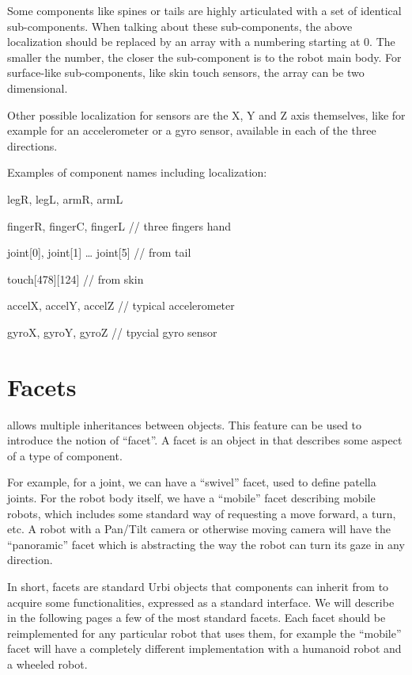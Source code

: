 Some components like spines or tails are highly articulated with a set
of identical sub-components. When talking about these sub-components,
the above localization should be replaced by an array with a numbering
starting at 0. The smaller the number, the closer the sub-component is
to the robot main body. For surface-like sub-components, like skin
touch sensors, the array can be two dimensional.


Other possible localization for sensors are the X, Y and Z axis
themselves, like for example for an accelerometer or a gyro sensor,
available in each of the three directions.


Examples of component names including localization:

{
legR, legL, armR, armL}

{
fingerR, fingerC, fingerL // three fingers hand}

{
joint[0], joint[1] … joint[5] // from tail}

{
touch[478][124] // from skin}

{
accelX, accelY, accelZ // typical accelerometer}

{
gyroX, gyroY, gyroZ // tpycial gyro sensor}

\section{Facets}

\urbi allows multiple inheritances between objects. This feature can be
used to introduce the notion of “facet”. A facet is an object in \urbi
that describes some aspect of a type of component.


For example, for a joint, we can have a “swivel” facet, used to define
patella joints. For the robot body itself, we have a “mobile” facet
describing mobile robots, which includes some standard way of
requesting a move forward, a turn, etc. A robot with a Pan/Tilt camera
or otherwise moving camera will have the “panoramic” facet which is
abstracting the way the robot can turn its gaze in any direction.


In short, facets are standard Urbi objects that components can inherit
from to acquire some functionalities, expressed as a standard
interface. We will describe in the following pages a few of the most
standard facets. Each facet should be reimplemented for any particular
robot that uses them, for example the “mobile” facet will have a
completely different implementation with a humanoid robot and a wheeled
robot.

